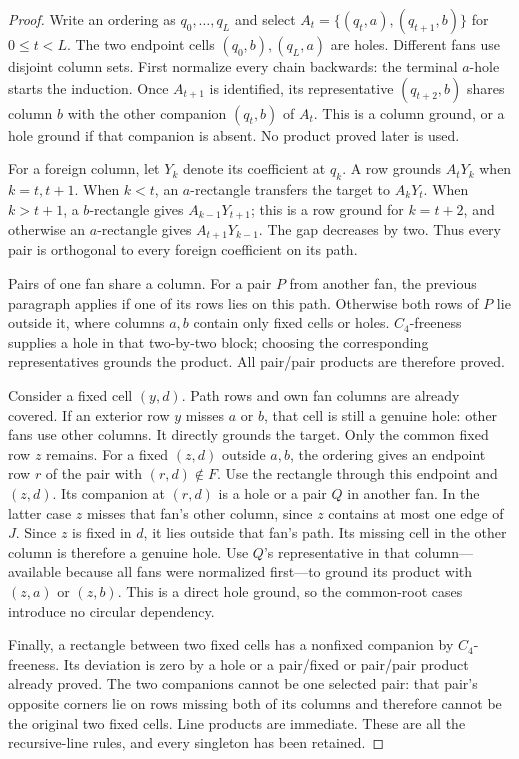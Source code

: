\begin{proof}
Write an ordering as $q_0,\ldots,q_L$ and select
$A_t=\{(q_t,a),(q_{t+1},b)\}$ for $0\le t<L$.
The two endpoint cells $(q_0,b),(q_L,a)$ are holes. Different fans use
disjoint column sets. First normalize every chain backwards: the terminal
$a$-hole starts the induction. Once $A_{t+1}$ is identified, its representative
$(q_{t+2},b)$ shares column $b$ with the other companion $(q_t,b)$
of $A_t$. This is a column ground, or a hole ground if that companion
is absent. No product proved later is used.

For a foreign column, let $Y_k$ denote its coefficient at $q_k$.
A row grounds $A_tY_k$ when $k=t,t+1$. When $k<t$, an $a$-rectangle
transfers the target to $A_kY_t$. When $k>t+1$, a $b$-rectangle gives
$A_{k-1}Y_{t+1}$; this is a row ground for $k=t+2$, and otherwise an
$a$-rectangle gives $A_{t+1}Y_{k-1}$. The gap decreases by two.
Thus every pair is orthogonal to every foreign coefficient on its path.

Pairs of one fan share a column. For a pair $P$ from another fan, the
previous paragraph applies if one of its rows lies on this path. Otherwise
both rows of $P$ lie outside it, where columns $a,b$ contain only fixed
cells or holes. $C_4$-freeness supplies a hole in that two-by-two block;
choosing the corresponding representatives grounds the product. All
pair/pair products are therefore proved.

Consider a fixed cell $(y,d)$. Path rows and own fan columns are already
covered. If an exterior row $y$ misses $a$ or $b$, that cell is still a
genuine hole: other fans use other columns. It directly grounds the target.
Only the common fixed row $z$ remains. For a fixed $(z,d)$ outside $a,b$,
the ordering gives an endpoint row $r$ of the pair with $(r,d)\notin F$.
Use the rectangle through this endpoint and $(z,d)$. Its companion at
$(r,d)$ is a hole or a pair $Q$ in another fan. In the latter case $z$
misses that fan's other column, since $z$ contains at most one edge of $J$.
Since $z$ is fixed in $d$, it lies outside that fan's path. Its missing
cell in the other column is therefore a genuine hole. Use $Q$'s
representative in that column---available because all fans were normalized
first---to ground its product with $(z,a)$ or $(z,b)$. This is a direct
hole ground, so the common-root cases introduce no circular dependency.

Finally, a rectangle between two fixed cells has a nonfixed companion
by $C_4$-freeness. Its deviation is zero by a hole or a pair/fixed or pair/pair product
already proved. The two companions cannot be one selected pair: that
pair's opposite corners lie on rows missing both of its columns and
therefore cannot be the original two fixed cells. Line products are
immediate. These are all the recursive-line rules, and every singleton
has been retained.
\end{proof}

